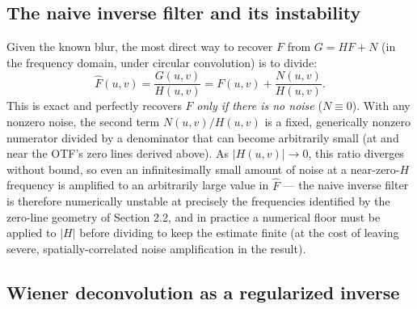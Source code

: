 \documentclass[11pt]{article}
\begin{document}
\subsection{The naive inverse filter and its instability}

Given the known blur, the most direct way to recover $F$ from $G=HF+N$ (in the frequency
domain, under circular convolution) is to divide:
\[
\hat F(u,v) = \frac{G(u,v)}{H(u,v)} = F(u,v) + \frac{N(u,v)}{H(u,v)}.
\]
This is exact and perfectly recovers $F$ \emph{only if there is no noise} ($N\equiv0$). With
any nonzero noise, the second term $N(u,v)/H(u,v)$ is a fixed, generically nonzero numerator
divided by a denominator that can become arbitrarily small (at and near the OTF's zero lines
derived above). As $|H(u,v)|\to 0$, this ratio diverges without bound, so even an
infinitesimally small amount of noise at a near-zero-$H$ frequency is amplified to an arbitrarily
large value in $\hat F$ — the naive inverse filter is therefore numerically unstable at
precisely the frequencies identified by the zero-line geometry of Section 2.2, and in practice a
numerical floor must be applied to $|H|$ before dividing to keep the estimate finite (at the
cost of leaving severe, spatially-correlated noise amplification in the result).

\subsection{Wiener deconvolution as a regularized inverse}
\end{document}
